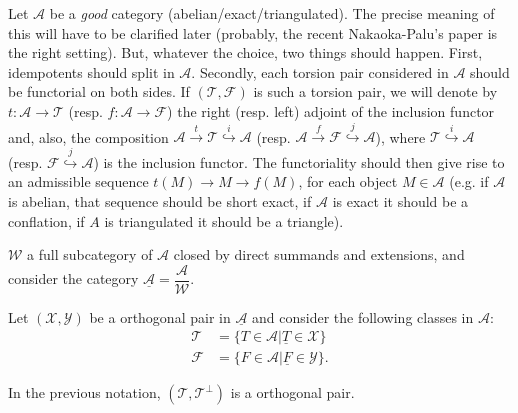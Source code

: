 Let $\mathcal{A}$ be a \emph{good} category (abelian/exact/triangulated). The precise meaning of this will have to be clarified later (probably, the recent Nakaoka-Palu's paper is the right setting). But, whatever the choice, two things should happen. First, idempotents should split in $\mathcal{A}$. Secondly,  each torsion pair considered  in $\mathcal{A}$ should be functorial on both sides. If $(\mathcal{T},\mathcal{F})$ is such a torsion pair, we will denote by $t:\mathcal{A}\longrightarrow\mathcal{T}$ (resp. $f:\mathcal{A}\longrightarrow\mathcal{F}$) the right (resp. left) adjoint of the inclusion functor and, also, the composition $\mathcal{A}\stackrel{t}{\longrightarrow}\mathcal{T}\stackrel{i}{\hookrightarrow}\mathcal{A}$ (resp. $\mathcal{A}\stackrel{f}{\longrightarrow}\mathcal{F}\stackrel{j}{\hookrightarrow}\mathcal{A}$), where $\mathcal{T}\stackrel{i}{\hookrightarrow}\mathcal{A}$
(resp. $\mathcal{F}\stackrel{j}{\hookrightarrow}\mathcal{A}$) is the inclusion functor. The functoriality should then give rise to an admissible sequence $t(M)\longrightarrow M\longrightarrow f(M)$, for each object $M\in\mathcal{A}$ (e.g. if $\mathcal{A}$ is abelian, that sequence should be short exact, if $\mathcal{A}$ is exact it should be a conflation, if $A$ is triangulated it should be a triangle).



$\mathcal{W}$ a full subcategory of $\mathcal{A}$ closed by direct summands and extensions, and consider the category $\underline{\mathcal{A}}=\dfrac{\mathcal{A}}{\mathcal{W}}$.

Let $(\mathcal{X},\mathcal{Y})$ be a orthogonal pair in $\underline{\mathcal{A}}$ and consider the following classes in $\mathcal{A}$:
\begin{align*}
  \mathcal{T} &= \{ T\in\mathcal{A} | \underline{T}\in\mathcal{X} \} \\
  \mathcal{F} &= \{ F\in\mathcal{A} | \underline{F}\in\mathcal{Y} \}.
\end{align*}

\begin{lemma}
  In the previous notation, $(\mathcal{T}, \mathcal{T}^\perp)$ is a orthogonal pair.
\end{lemma}

